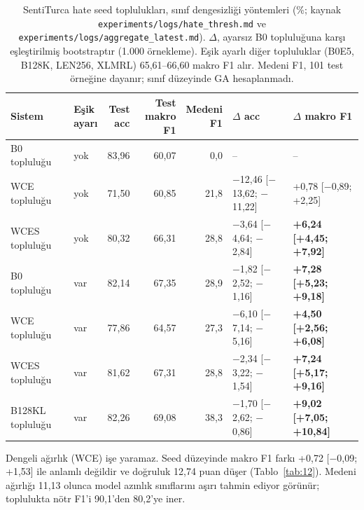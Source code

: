 \documentclass[11pt]{article}
\begin{document}
\begin{table}[!htbp]
\centering
\footnotesize
\setlength{\tabcolsep}{3pt}
\begin{tabular}{llrrrll}
\toprule
Sistem & \makecell[l]{Eşik \\ ayarı} & \makecell[r]{Test \\ acc} & \makecell[r]{Test \\ makro F1} & \makecell[r]{Medeni \\ F1} & $\Delta$ acc & $\Delta$ makro F1 \\
\midrule
B0 topluluğu & yok & \mbox{83,96} & \mbox{60,07} & \mbox{0,0} & – & – \\
WCE topluluğu & yok & \mbox{71,50} & \mbox{60,85} & \mbox{21,8} & $-$12,46 [$-$13,62; $-$11,22] & +0,78 [$-$0,89; +2,25] \\
WCES topluluğu & yok & \mbox{80,32} & \mbox{66,31} & \mbox{28,8} & $-$3,64 [$-$4,64; $-$2,84] & \textbf{+6,24 [+4,45; +7,92]} \\
B0 topluluğu & var & \mbox{82,14} & \mbox{67,35} & \mbox{28,9} & $-$1,82 [$-$2,52; $-$1,16] & \textbf{+7,28 [+5,23; +9,18]} \\
WCE topluluğu & var & \mbox{77,86} & \mbox{64,57} & \mbox{27,3} & $-$6,10 [$-$7,14; $-$5,16] & \textbf{+4,50 [+2,56; +6,08]} \\
WCES topluluğu & var & \mbox{81,62} & \mbox{67,31} & \mbox{28,8} & $-$2,34 [$-$3,22; $-$1,54] & \textbf{+7,24 [+5,17; +9,16]} \\
B128KL topluluğu & var & \mbox{82,26} & \mbox{69,08} & \mbox{38,3} & $-$1,70 [$-$2,62; $-$0,86] & \textbf{+9,02 [+7,05; +10,84]} \\
\bottomrule
\end{tabular}
\caption{SentiTurca hate seed toplulukları, sınıf dengesizliği yöntemleri (\%; kaynak \texttt{experiments/\allowbreak{}\allowbreak{}logs/\allowbreak{}\allowbreak{}hate\_\allowbreak{}\allowbreak{}thresh.\allowbreak{}\allowbreak{}md} ve \texttt{experiments/\allowbreak{}\allowbreak{}logs/\allowbreak{}\allowbreak{}aggregate\_\allowbreak{}\allowbreak{}latest.\allowbreak{}\allowbreak{}md}). $\Delta$, ayarsız B0 topluluğuna karşı eşleştirilmiş bootstraptır (1.000 örnekleme). Eşik ayarlı diğer topluluklar (B0E5, B128K, LEN256, XLMRL) 65,61–66,60 makro F1 alır. Medeni F1, 101 test örneğine dayanır; sınıf düzeyinde GA hesaplanmadı.}
\label{tab:13}
\end{table}

Dengeli ağırlık (WCE) işe yaramaz. Seed düzeyinde makro F1 farkı +0,72 [$-$0,09; +1,53] ile anlamlı değildir ve doğruluk 12,74 puan düşer (Tablo~\ref{tab:12}). Medeni ağırlığı 11,13 olunca model azınlık sınıflarını aşırı tahmin ediyor görünür; toplulukta nötr F1'i 90,1'den 80,2'ye iner.
\end{document}
